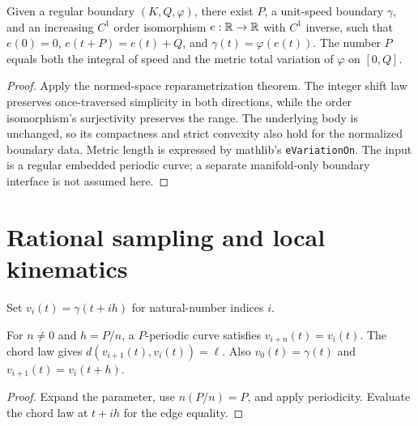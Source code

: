 \begin{proposition}
\label{prop:arclength}
\leanok
{}
Given a regular boundary $(K,Q,\varphi)$, there exist $P$, a unit-speed
boundary $\gamma$, and an increasing $C^1$ order isomorphism $e:\mathbb{R}\to\mathbb{R}$
with $C^1$ inverse, such that $e(0)=0$, $e(t+P)=e(t)+Q$, and
$\gamma(t)=\varphi(e(t))$. The number $P$ equals both the integral of speed
and the metric total variation of $\varphi$ on $[0,Q]$.
\end{proposition}
\begin{proof}
\leanok
Apply the normed-space reparametrization theorem. The integer shift law
preserves once-traversed simplicity in both directions, while the order
isomorphism's surjectivity preserves the range. The underlying body is
unchanged, so its compactness and strict convexity also hold for the
normalized boundary data. Metric length is expressed by mathlib's
\texttt{eVariationOn}. The input is a regular embedded periodic curve;
a separate manifold-only boundary interface is not assumed here.
\end{proof}

\section{Rational sampling and local kinematics}

\begin{definition}
\label{def:sampling}
\leanok
Set $v_i(t)=\gamma(t+ih)$ for natural-number indices $i$.
\end{definition}

\begin{lemma}
\label{lem:sampling}
\leanok
{}
For $n\neq0$ and $h=P/n$, a $P$-periodic curve satisfies
$v_{i+n}(t)=v_i(t)$. The chord law gives
$d(v_{i+1}(t),v_i(t))=\ell$. Also $v_0(t)=\gamma(t)$ and
$v_{i+1}(t)=v_i(t+h)$.
\end{lemma}
\begin{proof}
\leanok
Expand the parameter, use $n(P/n)=P$, and apply periodicity.
Evaluate the chord law at $t+ih$ for the edge equality.
\end{proof}

